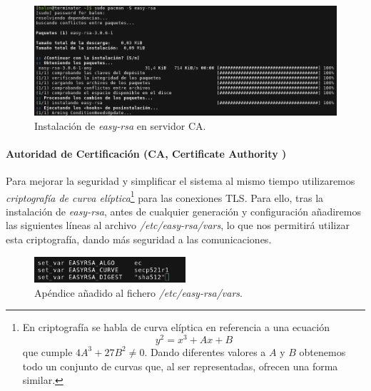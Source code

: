 \documentclass[a4paper, 11pt, titlepage]{article}
\begin{document}
            \begin{figure}[htp]
                \centering
                \includegraphics[width=1\textwidth]{resources/ca03.png}
                \caption{Instalación de \textit{easy-rsa} en servidor CA.}
                \label{ca03}
            \end{figure}
        
            \paragraph{Autoridad de Certificación (CA, Certificate Authority )}
        
            Para mejorar la seguridad y simplificar el sistema al mismo tiempo utilizaremos \textit{criptografía de curva elíptica}\footnote{
        
                En criptografía se habla de curva elíptica en referencia a una ecuación
                \[
                y^2=x^3+Ax+B
                \]
                que cumple $4A^3+27B^2\neq0$. Dando diferentes valores a $A$ y $B$
                obtenemos todo un conjunto de curvas que, al ser representadas, ofrecen 
                una forma similar. 
        
            } para las conexiones TLS. Para ello, tras la instalación
            de \textit{easy-rsa}, antes de cualquier generación y configuración añadiremos las siguientes líneas al archivo \textit{/etc/easy-rsa/vars}, lo que nos permitirá utilizar
            esta criptografía, dando más seguridad a las comunicaciones.
        
            \begin{figure}[htp]
                \centering
                \includegraphics[width=0.5\textwidth]{resources/ca04.png}
                \caption{Apéndice añadido al fichero \textit{/etc/easy-rsa/vars}.}
                \label{ca04}
            \end{figure}
        
\end{document}
